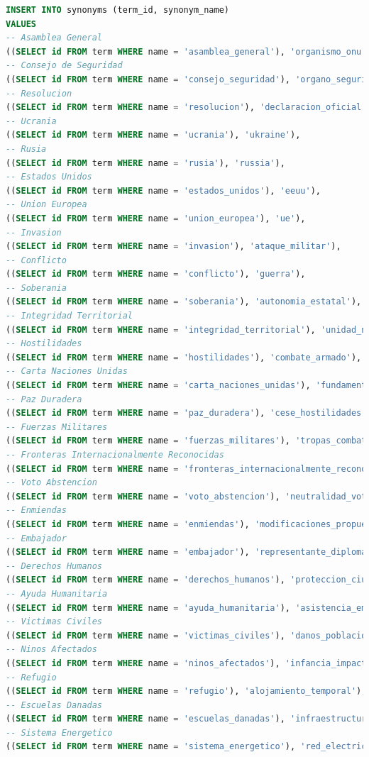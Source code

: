 \documentclass[twoside]{article}
\begin{document}
\begin{lstlisting}[language=SQL,caption={Inserting Synonyms},label={lst:insertsynonyms}]
INSERT INTO synonyms (term_id, synonym_name)
VALUES
-- Asamblea General
((SELECT id FROM term WHERE name = 'asamblea_general'), 'organismo_onu'),
-- Consejo de Seguridad
((SELECT id FROM term WHERE name = 'consejo_seguridad'), 'organo_seguridad_onu'),
-- Resolucion
((SELECT id FROM term WHERE name = 'resolucion'), 'declaracion_oficial'),
-- Ucrania
((SELECT id FROM term WHERE name = 'ucrania'), 'ukraine'),
-- Rusia
((SELECT id FROM term WHERE name = 'rusia'), 'russia'),
-- Estados Unidos
((SELECT id FROM term WHERE name = 'estados_unidos'), 'eeuu'),
-- Union Europea
((SELECT id FROM term WHERE name = 'union_europea'), 'ue'),
-- Invasion
((SELECT id FROM term WHERE name = 'invasion'), 'ataque_militar'),
-- Conflicto
((SELECT id FROM term WHERE name = 'conflicto'), 'guerra'),
-- Soberania
((SELECT id FROM term WHERE name = 'soberania'), 'autonomia_estatal'),
-- Integridad Territorial
((SELECT id FROM term WHERE name = 'integridad_territorial'), 'unidad_nacional'),
-- Hostilidades
((SELECT id FROM term WHERE name = 'hostilidades'), 'combate_armado'),
-- Carta Naciones Unidas
((SELECT id FROM term WHERE name = 'carta_naciones_unidas'), 'fundamentos_onu'),
-- Paz Duradera
((SELECT id FROM term WHERE name = 'paz_duradera'), 'cese_hostilidades'),
-- Fuerzas Militares
((SELECT id FROM term WHERE name = 'fuerzas_militares'), 'tropas_combate'),
-- Fronteras Internacionalmente Reconocidas
((SELECT id FROM term WHERE name = 'fronteras_internacionalmente_reconocidas'), 'limites_legales'),
-- Voto Abstencion
((SELECT id FROM term WHERE name = 'voto_abstencion'), 'neutralidad_votacion'),
-- Enmiendas
((SELECT id FROM term WHERE name = 'enmiendas'), 'modificaciones_propuesta'),
-- Embajador
((SELECT id FROM term WHERE name = 'embajador'), 'representante_diplomatico'),
-- Derechos Humanos
((SELECT id FROM term WHERE name = 'derechos_humanos'), 'proteccion_ciudadanos'),
-- Ayuda Humanitaria
((SELECT id FROM term WHERE name = 'ayuda_humanitaria'), 'asistencia_emergencia'),
-- Victimas Civiles
((SELECT id FROM term WHERE name = 'victimas_civiles'), 'danos_poblacion_no_combatiente'),
-- Ninos Afectados
((SELECT id FROM term WHERE name = 'ninos_afectados'), 'infancia_impactada'),
-- Refugio
((SELECT id FROM term WHERE name = 'refugio'), 'alojamiento_temporal'),
-- Escuelas Danadas
((SELECT id FROM term WHERE name = 'escuelas_danadas'), 'infraestructura_educativa_destruida'),
-- Sistema Energetico
((SELECT id FROM term WHERE name = 'sistema_energetico'), 'red_electrica'),

\end{lstlisting}
\end{document}
